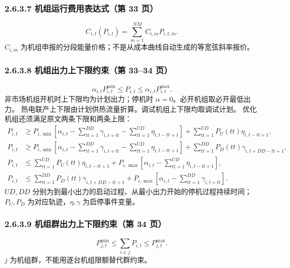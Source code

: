 \subsubsection{2.6.3.7 机组运行费用表达式（第 33 页）}
\begin{equation}
 C_{i,t}(P_{i,t})=\sum_{m=1}^{NM}C_{i,m}P_{i,t,m}.
\end{equation}
$C_{i,m}$ 为机组申报的分段能量价格；不是从成本曲线自动生成的等宽弦斜率报价。

\subsubsection{2.6.3.8 机组出力上下限约束（第 33--34 页）}
\begin{equation}
 \alpha_{i,t}P^{\min}_{i,t}\le P_{i,t}\le\alpha_{i,t}P^{\max}_{i,t}.
\end{equation}
非市场机组开机时上下限均为计划出力；停机时 $\alpha=0$。必开机组取必开最低出力。
热电联产上下限由计划供热流量折算。调试机组上下限均取调试计划。
优化机组还须满足原文两条下限和两条上限：
\begin{align}
 P_{i,t}&\ge P_{i,\min}\left[\alpha_{i,t}-\sum_{tt=1}^{DD}\gamma_{i,t+tt}
                 -\sum_{tt=1}^{UD}\eta_{i,t-tt+1}\right]
                 +\sum_{tt=1}^{UD}P_U(tt)\eta_{i,t-tt+1},\\
 P_{i,t}&\ge P_{i,\min}\left[\alpha_{i,t}-\sum_{tt=1}^{DD}\gamma_{i,t+tt}
                 -\sum_{tt=1}^{UD}\eta_{i,t-tt+1}\right]
                 +\sum_{tt=1}^{DD}P_D(tt)\gamma_{i,t+DD-tt+1},\\
 P_{i,t}&\le\sum_{tt=1}^{UD}P_U(tt)\eta_{i,t-tt+1}
                 +P_{i,\max}\left[\alpha_{i,t}-\sum_{tt=1}^{UD}\eta_{i,t-tt+1}\right],\\
 P_{i,t}&\le\sum_{tt=1}^{DD}P_D(tt)\gamma_{i,t+DD-tt+1}
                 +P_{i,\max}\left[\alpha_{i,t}-\sum_{tt=1}^{DD}\gamma_{i,t+tt}\right].
\end{align}
$UD,DD$ 分别为到最小出力的启动过程、从最小出力开始的停机过程持续时间；
$P_U,P_D$ 为对应轨迹，$\eta,\gamma$ 为启停事件变量。

\subsubsection{2.6.3.9 机组群出力上下限约束（第 34 页）}
\begin{equation}
 P^{\min}_{j,t}\le\sum_{i\in j}P_{i,t}\le P^{\max}_{j,t}.
\end{equation}
$j$ 为机组群，不能用逐台机组限额替代群约束。

